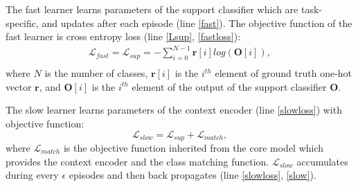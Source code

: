 The fast learner learns parameters of the support classifier which are task-specific, and updates after each episode (line \ref{fast}). The objective function of the fast learner is cross entropy loss (line \ref{Lsup}, \ref{fastloss}):
\begin{equation}
\begin{aligned}
    \mathcal{L}_{fast} = \mathcal{L}_{sup}= - \sum_{i=0}^{N-1} \mathbf{r}[i] log(\mathbf{O}[i]), \\
\end{aligned}
\end{equation}
where $N$ is the number of classes, $\mathbf{r}[i]$ is the $i^{th}$ element of ground truth one-hot vector $\mathbf{r}$, and $\mathbf{O}[i]$ is the $i^{th}$ element of the output of the support classifier $\mathbf{O}$.

The slow learner learns parameters of the context encoder (line \ref{slowloss}) with objective function:
\begin{equation}
\mathcal{L}_{slow} = \mathcal{L}_{sup} + \mathcal{L}_{match},
\end{equation}
where $\mathcal{L}_{match}$ is the objective function inherited from the core model which provides the context encoder and the class matching function. $\mathcal{L}_{slow}$ accumulates during every $\epsilon$ episodes and then back propagates (line \ref{slowloss}, \ref{slow}).


